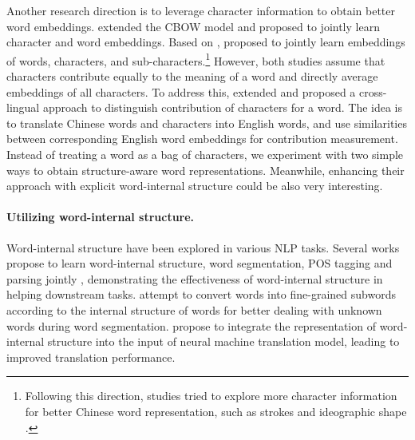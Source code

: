 Another research direction is to leverage character information to obtain better word embeddings. 
\citet{chen-ijcai2015-joint-char-word-emb} extended the CBOW model and proposed to jointly learn character and word embeddings.
Based on \citet{chen-ijcai2015-joint-char-word-emb}, \citet{xu-emnlp-2017-short} proposed to jointly learn embeddings of words, characters, and sub-characters.\footnote{Following this direction, studies tried to explore more character information for better Chinese word representation, such as strokes \cite{cao-aaai-2018-strokes} and ideographic shape \cite{sun-naacl-2019-visual}.}
However, both studies assume that characters contribute equally to the meaning of a word and directly average embeddings of all characters. 
To address this,  
\citet{xu-naacl-2016-internal-structure} extended \citet{chen-ijcai2015-joint-char-word-emb} and proposed a cross-lingual approach to distinguish contribution of characters for a word.
The idea is to translate Chinese words and characters into English words, and use similarities between corresponding English word embeddings for contribution measurement. 
Instead of treating a word as a bag of characters, we experiment with two simple ways to obtain structure-aware word representations. Meanwhile, enhancing their approach with explicit  word-internal structure could be also very interesting.

\paragraph{Utilizing word-internal structure.} 
Word-internal structure have been explored in various NLP tasks.
Several works propose to learn word-internal structure, word segmentation, POS tagging and parsing jointly \cite{zhang-etal-2013-char,zhang-etal-2014-char,li-etal-aaai-2018-zhaohai}, demonstrating the effectiveness of word-internal structure in helping downstream tasks.
\citet{cheng2015synthetic} attempt to convert words
into fine-grained subwords according to the internal structure of words for better dealing with unknown words during word segmentation. 
\citet{linqian2020} propose to integrate the representation of word-internal structure into the input of neural machine translation model, leading to improved translation performance.



















